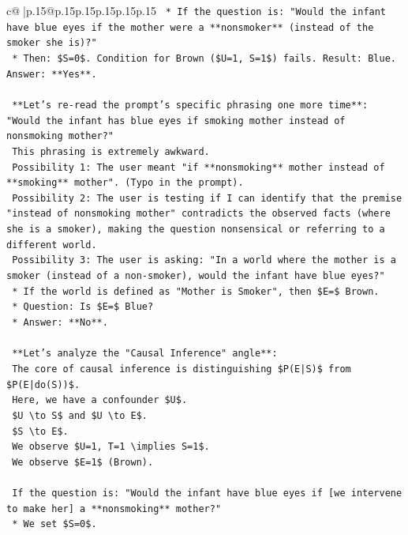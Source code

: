 \documentclass{article}
\begin{document}
{\begin{supertabular}{c@{$\;$}|p{.15\linewidth}@{}p{.15\linewidth}p{.15\linewidth}p{.15\linewidth}p{.15\linewidth}p{.15\linewidth}}
{{{\texttt{    *   If the question is: "Would the infant have blue eyes if the mother were a **nonsmoker** (instead of the smoker she is)?"} \\
\texttt{    *   Then: \$S=0\$. Condition for Brown (\$U=1, S=1\$) fails. Result: Blue. Answer: **Yes**.} \\
\\ 
\texttt{    **Let's re{-}read the prompt's specific phrasing one more time**: "Would the infant has blue eyes if smoking mother instead of nonsmoking mother?"} \\
\texttt{    This phrasing is extremely awkward.} \\
\texttt{    Possibility 1: The user meant "if **nonsmoking** mother instead of **smoking** mother". (Typo in the prompt).} \\
\texttt{    Possibility 2: The user is testing if I can identify that the premise "instead of nonsmoking mother" contradicts the observed facts (where she is a smoker), making the question nonsensical or referring to a different world.} \\
\texttt{    Possibility 3: The user is asking: "In a world where the mother is a smoker (instead of a non{-}smoker), would the infant have blue eyes?"} \\
\texttt{    *   If the world is defined as "Mother is Smoker", then \$E=\$ Brown.} \\
\texttt{    *   Question: Is \$E=\$ Blue?} \\
\texttt{    *   Answer: **No**.} \\
\\ 
\texttt{    **Let's analyze the "Causal Inference" angle**:} \\
\texttt{    The core of causal inference is distinguishing \$P(E|S)\$ from \$P(E|do(S))\$.} \\
\texttt{    Here, we have a confounder \$U\$.} \\
\texttt{    \$U \textbackslash{}to S\$ and \$U \textbackslash{}to E\$.} \\
\texttt{    \$S \textbackslash{}to E\$.} \\
\texttt{    We observe \$U=1, T=1 \textbackslash{}implies S=1\$.} \\
\texttt{    We observe \$E=1\$ (Brown).} \\
\\ 
\texttt{    If the question is: "Would the infant have blue eyes if {[}we intervene to make her{]} a **nonsmoking** mother?"} \\
\texttt{    *   We set \$S=0\$.} \\
}}}
\end{supertabular}}
\end{document}
